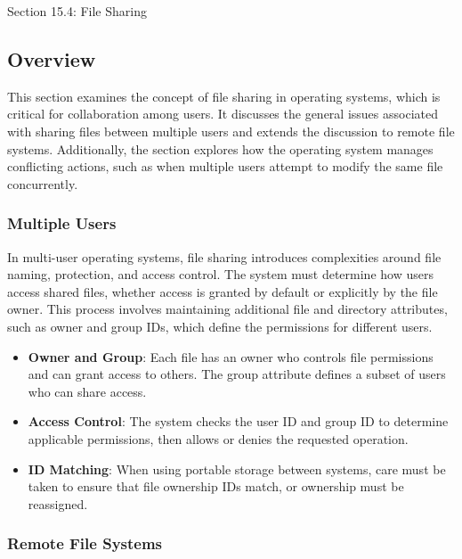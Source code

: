 \begin{notes}{Section 15.4: File Sharing}
    \subsection*{Overview}

    This section examines the concept of file sharing in operating systems, which is critical for collaboration among users. It discusses the general issues associated with sharing files between multiple 
    users and extends the discussion to remote file systems. Additionally, the section explores how the operating system manages conflicting actions, such as when multiple users attempt to modify the same 
    file concurrently.
    
    \subsubsection*{Multiple Users}
    
    In multi-user operating systems, file sharing introduces complexities around file naming, protection, and access control. The system must determine how users access shared files, whether access is granted 
    by default or explicitly by the file owner. This process involves maintaining additional file and directory attributes, such as owner and group IDs, which define the permissions for different users.
    
    \begin{highlight}
    
        \begin{itemize}
            \item \textbf{Owner and Group}: Each file has an owner who controls file permissions and can grant access to others. The group attribute defines a subset of users who can share access.
            \item \textbf{Access Control}: The system checks the user ID and group ID to determine applicable permissions, then allows or denies the requested operation.
            \item \textbf{ID Matching}: When using portable storage between systems, care must be taken to ensure that file ownership IDs match, or ownership must be reassigned.
        \end{itemize}
    
    \end{highlight}
    
    \subsubsection*{Remote File Systems}
    

\end{notes}
